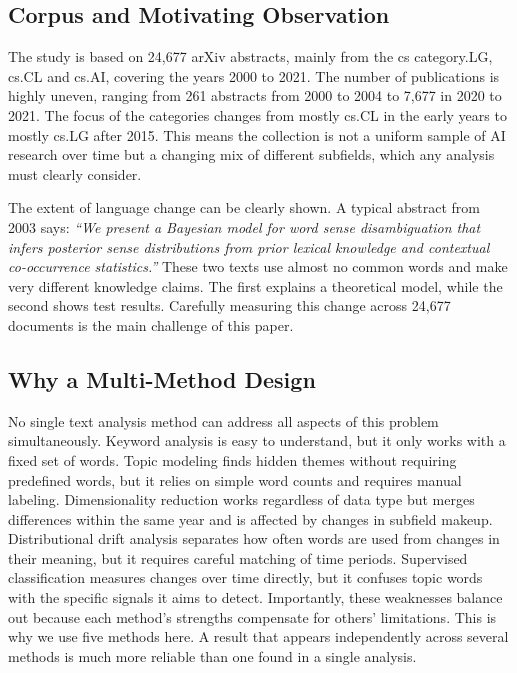 \subsection{Corpus and Motivating Observation}

The study is based on 24,677 arXiv abstracts, mainly from the cs category.LG, cs.CL and cs.AI, covering the years 2000 to 2021. The number of publications is highly uneven, ranging from 261 abstracts from 2000 to 2004 to 7,677 in 2020 to 2021. The focus of the categories changes from mostly cs.CL in the early years to mostly cs.LG after 2015. This means the collection is not a uniform sample of AI research over time but a changing mix of different subfields, which any analysis must clearly consider.

The extent of language change can be clearly shown. A typical abstract from 2003 says: \textit{``We present a Bayesian model for word sense disambiguation that infers posterior sense distributions from prior lexical knowledge and contextual co-occurrence statistics.''} These two texts use almost no common words and make very different knowledge claims. The first explains a theoretical model, while the second shows test results. Carefully measuring this change across 24,677 documents is the main challenge of this paper.

\subsection{Why a Multi-Method Design}

No single text analysis method can address all aspects of this problem simultaneously. Keyword analysis is easy to understand, but it only works with a fixed set of words. Topic modeling finds hidden themes without requiring predefined words, but it relies on simple word counts and requires manual labeling. Dimensionality reduction works regardless of data type but merges differences within the same year and is affected by changes in subfield makeup. Distributional drift analysis separates how often words are used from changes in their meaning, but it requires careful matching of time periods. Supervised classification measures changes over time directly, but it confuses topic words with the specific signals it aims to detect. Importantly, these weaknesses balance out because each method's strengths compensate for others' limitations. This is why we use five methods here. A result that appears independently across several methods is much more reliable than one found in a single analysis.
\newpage